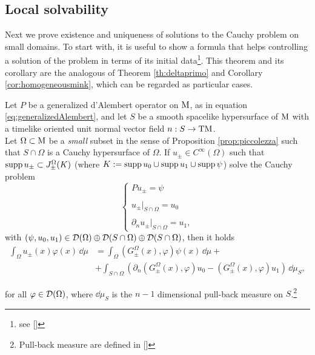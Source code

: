 \subsection{Local solvability}


Next we prove existence and uniqueness of solutions to the Cauchy problem on small domains. To start with, it is useful to show a formula that helps controlling a solution of the problem in terms of its initial data\footnote{see [\citealp[Lem 3.2.2]{bar2}]}. This theorem and its corollary are the analogous of Theorem \ref{th:deltaprimo} and Corollary \ref{cor:homogeneousmink}, which can be regarded as particular cases.

\begin{theorem}
	Let $P$ be a generalized d'Alembert operator on $\mathrm{M}$, as in equation \eqref{eq:generalizedAlembert}, and let $S$ be a smooth spacelike hypersurface of $\mathrm{M}$ with a timelike oriented unit normal vector field $n:S\to\mathrm{T}\mathrm{M}$.\\
	Let $\Omega\subset\mathrm{M}$ be a \emph{small} subset in the sense of Proposition \ref{prop:piccolezza} such that $S\cap\Omega$ is a Cauchy hypersurface of $\Omega$. If $u_\pm\in C^\infty(\Omega)$
	such that $\text{supp}\,u_\pm\subset J_\pm^\Omega(K)$ (where $K:=\text{supp}\, u_0\cup\text{supp}\,u_1\cup\text{supp}\,\psi$)
	solve the Cauchy problem
	\begin{equation}
	\begin{cases}
	P u_\pm=\psi\\
	\\
	u_\pm|_{S\cap\Omega}=u_0\\
	\\
	\partial_n u_\pm|_{S\cap\Omega}=u_1,
	\end{cases}
	\end{equation}
	with $(\psi,u_0,u_1)\in\mathcal{D}(\Omega)\oplus\mathcal{D}(S\cap\Omega)\oplus\mathcal{D}(S\cap\Omega)$, then it holds
\begin{equation}
	\begin{aligned}
	\int_{\Omega}u_\pm(x)\varphi(x)\,\dd\mu&=\int_{\Omega}\left(G_\pm^\Omega(x),\varphi\right)\psi(x)\,\dd\mu+\\
	&+\int_{S\cap\Omega}\left(\partial_n(G_\pm^\Omega(x),\varphi)u_0-(G_\pm^\Omega(x),\varphi)u_1\right)\,\dd \mu_S,
	\end{aligned}
	\label{eq:formulagenerale}
\end{equation}
	
	\noindent for all $\varphi\in\mathcal{D}(\Omega)$, where $\dd \mu_S$ is the $n-1$ dimensional pull-back measure on $S$.\footnote{Pull-back measure are defined in [\citealp[Ch. 1]{pullback}]}
	\label{th:integraledisuperficie}
\end{theorem}
